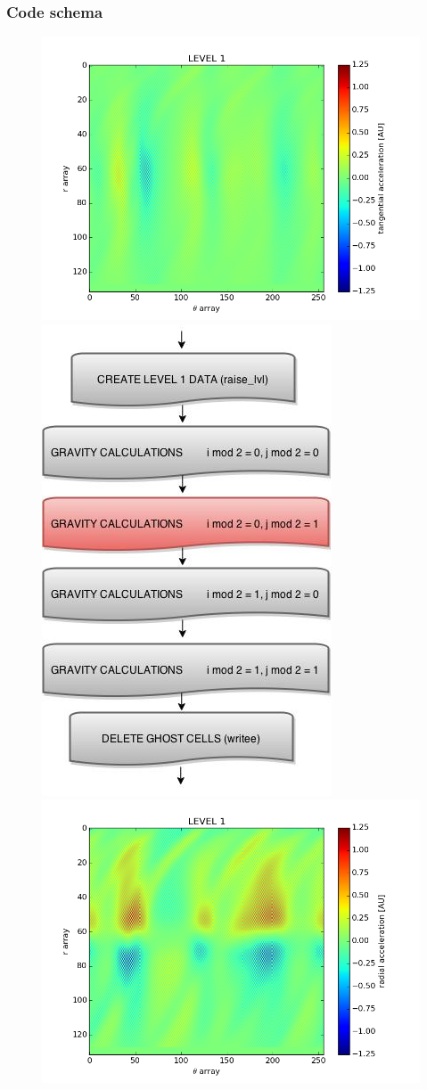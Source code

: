 \documentclass{beamer}
\begin{document}
\begin{frame}
\frametitle{Code schema}

\begin{figure}

\includegraphics[width = .4\textwidth]{./level1_2_tangential.png}
\includegraphics[width = .2\textwidth]{./Grav_Diagram2.jpg}
\includegraphics[width = .4\textwidth]{./level1_2_radial.png}
\end{figure}

\end{frame}
\end{document}
